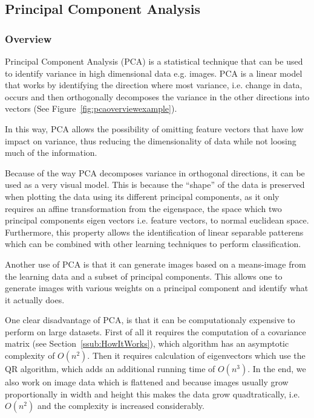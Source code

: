 \subsection{Principal Component Analysis}
\label{sub:PCA}
\subsubsection{Overview}
\label{ssub:PCAOverview}
Principal Component Analysis (PCA) is a statistical technique that can be used to identify variance in high dimensional data e.g. images.
PCA is a linear model that works by identifying the direction where most variance, i.e. change in data,
occurs and then orthogonally decomposes the variance in the other directions into vectors (See Figure~\ref{fig:pcaoverviewexample}).\\
\begin{minipage}{\linewidth}
\centering
{}
\label{fig:pcaoverviewexample}
\end{minipage}
In this way, PCA allows the possibility of omitting feature vectors that have low impact on variance,
thus reducing the dimensionality of data while not loosing much of the information.

Because of the way PCA decomposes variance in orthogonal directions, it can be used as a very visual model. 
This is because the ``shape'' of the data is preserved when plotting the data using its different principal components, 
as it only requires an affine transformation from the eigenspace, the space which two principal components eigen vectors i.e. feature vectors,
to normal euclidean space.
Furthermore, this property allows the identification of linear separable patterens which can be combined with other learning techniques to
perform classification.

Another use of PCA is that it can generate images based on a means-image from the learning data and a subset of principal components.
This allows one to generate images with various weights on a principal component and identify what it actually does.

One clear disadvantage of PCA, is that it can be computationaly expensive to perform on large datasets.
First of all it requires the computation of a covariance matrix (see Section~\ref{ssub:HowItWorks}), which algorithm has an asymptotic complexity of $\mathit{O}(n^2)$.
Then it requires calculation of eigenvectors which use the QR algorithm, which adds an additional running time of $\mathit{O}(n^3)$\cite{abenz2012qralgorithm}.
In the end, we also work on image data which is flattened and because images usually grow proportionally in width and height this makes the data grow quadtratically, i.e. $\mathit{O}(n^2)$
and the complexity is increased considerably.

